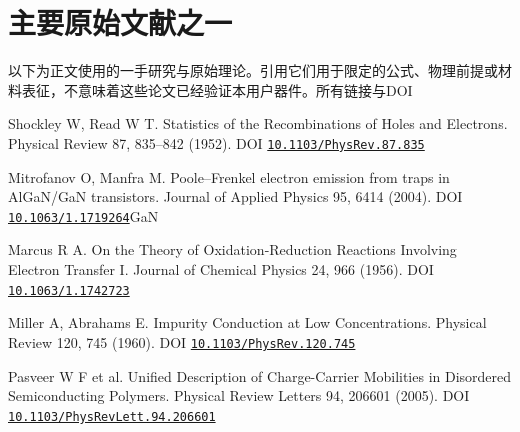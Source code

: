 \documentclass[11pt,a4paper]{article}
\makeatletter
\renewenvironment{thebibliography}[1]
 {\list{\@biblabel{\@arabic\c@enumiv}}{\settowidth\labelwidth{\@biblabel{#1}}\leftmargin\labelwidth\advance\leftmargin\labelsep\usecounter{enumiv}\setlength\itemsep{.4em}\setlength\parsep{0pt}}\sloppy}
 {\endlist}
\makeatother
\begin{document}
\section{{\cjkfont 主要原始文献之一}\allowbreak{}}\label{sec:61}
{\cjkfont 以下为正文使用的一手研究与原始理论。引用它们用于限定的公式、物理前提或材料表征，不意味着这些论文已经验证本用户器件。所有链接与}\allowbreak{}DOI\allowbreak{}
\par
\begin{thebibliography}{R20}
 Shockley W, Read W T. Statistics of the Recombinations of Holes and Electrons. Physical Review 87, 835–842 (1952). DOI \href{https://doi.org/10.1103/PhysRev.87.835}{\nolinkurl{10.1103/PhysRev.87.835}}\allowbreak{}
\par
 Mitrofanov O, Manfra M. Poole–Frenkel electron emission from traps in AlGaN/GaN transistors. Journal of Applied Physics 95, 6414 (2004). DOI \href{https://doi.org/10.1063/1.1719264}{\nolinkurl{10.1063/1.1719264}}\allowbreak{}GaN\allowbreak{}
\par
 Marcus R A. On the Theory of Oxidation-Reduction Reactions Involving Electron Transfer I. Journal of Chemical Physics 24, 966 (1956). DOI \href{https://doi.org/10.1063/1.1742723}{\nolinkurl{10.1063/1.1742723}}\allowbreak{}
\par
 Miller A, Abrahams E. Impurity Conduction at Low Concentrations. Physical Review 120, 745 (1960). DOI \href{https://doi.org/10.1103/PhysRev.120.745}{\nolinkurl{10.1103/PhysRev.120.745}}\allowbreak{}
\par
 Pasveer W F et al. Unified Description of Charge-Carrier Mobilities in Disordered Semiconducting Polymers. Physical Review Letters 94, 206601 (2005). DOI \href{https://doi.org/10.1103/PhysRevLett.94.206601}{\nolinkurl{10.1103/PhysRevLett.94.206601}}\allowbreak{}

\end{thebibliography}
\end{document}
